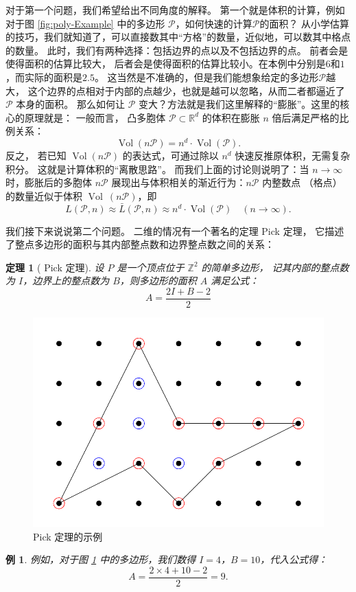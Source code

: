 \documentclass[12pt,a4paper]{ctexbook} %
\newcounter{theorem}[section]
\newtheorem{theoreminner}[theorem]{定理}
\newtheorem{example}[theorem]{例}
\numberwithin{figure}{section}
\theoremstyle{problemstyle}
\numberwithin{equation}{section} %
\begin{document}
对于第一个问题，我们希望给出不同角度的解释。
第一个就是体积的计算，例如对于图 \ref{fig:poly-Example} 中的多边形 $\mathcal{P}$，如何快速的计算$\mathcal{P}$的面积？
从小学估算的技巧，我们就知道了，可以直接数其中“方格”的数量，近似地，可以数其中格点的数量。
此时，我们有两种选择：包括边界的点以及不包括边界的点。
前者会是使得面积的估算比较大，
后者会是使得面积的估算比较小。在本例中分别是$6$和$1$，而实际的面积是$2.5$。
这当然是不准确的，但是我们能想象给定的多边形$\mathcal{P}$越大，
这个边界的点相对于内部的点越少，也就是越可以忽略，从而二者都逼近了 $\mathcal{P}$ 本身的面积。
那么如何让 $\mathcal{P}$ 变大？方法就是我们这里解释的“膨胀”。这里的核心的原理就是：
一般而言，
凸多胞体 \(\mathcal {P}\subset \mathbb{R}^d\) 的体积在膨胀 \(n\) 倍后满足严格的比例关系：
\[
\operatorname {Vol} (n\mathcal {P}) =  n^d\cdot\operatorname {Vol} (\mathcal {P}).
\]
反之， 
若已知 \(\operatorname {Vol} (n\mathcal {P})\) 的表达式，可通过除以 \(n^d\) 快速反推原体积，无需复杂积分。
这就是计算体积的“离散思路”。
而我们上面的讨论则说明了：当 \(n\to\infty\) 时，膨胀后的多胞体 \(n\mathcal {P}\) 展现出与体积相关的渐近行为：\(n\mathcal {P}\) 内整数点 （格点） 的数量近似于体积 \(\operatorname {Vol} \
(n\mathcal {P})\)，即
\[L(\mathcal{P}, n)
\approx 
\bar{L}(\mathcal{P}, n)
\approx 
n^d\cdot\operatorname {Vol} (\mathcal {P})\quad (n\to\infty).\]


我们接下来说说第二个问题。
二维的情况有一个著名的定理 Pick 定理，
它描述了整点多边形的面积与其内部整点数和边界整点数之间的关系：
\begin{theoreminner}[ Pick 定理]
设 \( P \) 是一个顶点位于 \( \mathbb{Z}^2 \) 的简单多边形，
记其内部的整点数为 \( I \)，边界上的整点数为 \( B \)，则多边形的面积 \( A \) 满足公式：
\[
A = \frac{2I + B - 2}{2}
\]
\end{theoreminner}
\begin{figure}
    \centering
    \includegraphics[width=0.7\linewidth]{pick.png}
    \caption{Pick 定理的示例}
    \label{fig:pick-thm}
\end{figure}
\begin{example}
例如，对于图 \ref{fig:pick-thm} 中的多边形，我们数得 \( I = 4 \)，\( B = 10 \)，代入公式得：
\[
A = \frac{2 \times 4 + 10 - 2}{2} = 9.
\]
\end{example}
\end{document}
